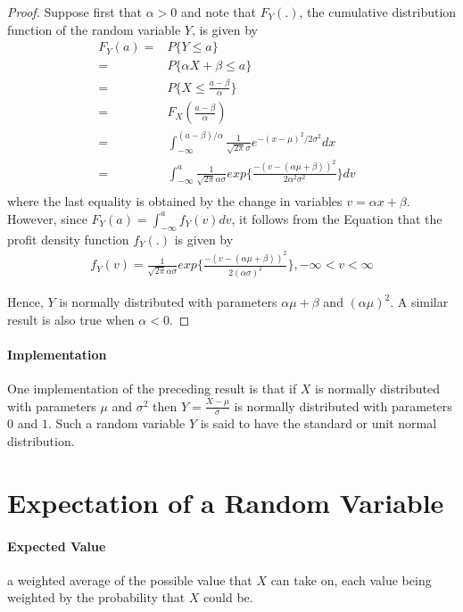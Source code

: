 \documentclass[10 pt,final]{article}
\newcommand{\impo}[1]{{\color{magenta} #1}}
\begin{document}
\begin{proof}
Suppose first that $\alpha >0$ and note that $F_Y(.)$, the cumulative distribution function of the random variable $Y$, is given by
\begin{align*}
F_Y(a) = & P\{ Y \leq a \} & \\
= & P\{\alpha X + \beta \leq a\} & \\
= & P\{ X \leq \frac{a - \beta}{\alpha}\} & \\
= & F_X(\frac{a-\beta}{\alpha}) & \\
= & \int_{-\infty}^{(a-\beta)/\alpha} \frac{1}{\sqrt{2 \pi} \sigma} e^{-(x-\mu)^2/2 \sigma^2} dx &\\
= &\int_{-\infty}^a \frac{1}{\sqrt{2 \pi} \alpha \sigma} exp\{ \frac{-(v-(\alpha \mu + \beta))^2}{2\alpha^2 \sigma^2}\} dv &\\
\end{align*}
where the last equality is obtained by the change in variables $v = \alpha x + \beta$. However, since $F_Y(a) = \int_{-\infty}^a f_Y(v) dv $, it follows from the Equation that the profit density function $f_Y(.)$ is given by 
\begin{align*}
f_Y(v) = \frac{1}{\sqrt{2 \pi} \alpha \sigma} exp\{ \frac{-(v-(\alpha \mu + \beta))^2}{2(\alpha \sigma)^2}\}, -\infty < v < \infty
\end{align*}

Hence, $Y$ is normally distributed with parameters $\alpha \mu + \beta$ and $(\alpha \mu)^2$. A similar result is also true when $\alpha < 0$.
\end{proof}

\paragraph{Implementation} One implementation of the preceding result is that if $X$ is normally distributed with parameters $\mu$ and $\sigma^2$ then $Y=\frac{X - \mu}{\sigma}$ is normally distributed with parameters $0$ and $1$. Such a random variable $Y$ is said to have the \impo{standard} or \impo{unit normal distribution}.
\section{Expectation of a Random Variable}
\paragraph{Expected Value} a weighted average of the possible value that $X$ can take on, each value being weighted by the probability that $X$ could be.
\end{document}
